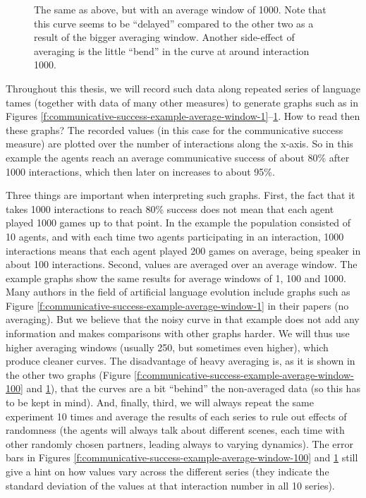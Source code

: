 \begin{figure}[p]
  \caption{The same as above, but with an average window of 1000. Note
    that this curve seems to be ``delayed'' compared to the other two
    as a result of the bigger averaging window. Another side-effect of
    averaging is the little ``bend'' in the curve at around
    interaction 1000.}
  \label{f:communicative-success-example-average-window-1000}
\end{figure}
\stopfiguregroup

\noindent Throughout this thesis, we will record such data along
repeated series of language tames (together with data of many other
measures) to generate graphs such as in Figures
\ref{f:communicative-success-example-average-window-1}--\ref{f:communicative-success-example-average-window-1000}. How
to read then these graphs? The recorded values (in this case for the
communicative success measure) are plotted over the number of
interactions along the x-axis. So in this example the agents reach an
average communicative success of about 80\% after 1000 interactions,
which then later on increases to about 95\%.

Three things are important when interpreting such graphs. First, the
fact that it takes 1000 interactions to reach 80\% success does not
mean that each agent played 1000 games up to that point. In the
example the population consisted of 10 agents, and with each time two
agents participating in an interaction, 1000 interactions means that
each agent played 200 games on average, being speaker in about 100
interactions. Second, values are averaged over an average window. The
example graphs show the same results for average windows of 1, 100 and
1000. Many authors in the field of artificial language evolution
include graphs such as Figure
\ref{f:communicative-success-example-average-window-1} in their papers
(no averaging). But we believe that the noisy curve in that example
does not add any information and makes comparisons with other graphs
harder. We will thus use higher averaging windows (usually 250, but
sometimes even higher), which produce cleaner curves. The disadvantage
of heavy averaging is, as it is shown in the other two graphs (Figure
\ref{f:communicative-success-example-average-window-100} and
\ref{f:communicative-success-example-average-window-1000}), that the
curves are a bit ``behind'' the non-averaged data (so this has to be
kept in mind). And, finally, third, we will always repeat the same
experiment 10 times and average the results of each series to rule out
effects of randomness (the agents will always talk about different
scenes, each time with other randomly chosen partners, leading always
to varying dynamics). The error bars in Figures
\ref{f:communicative-success-example-average-window-100} and
\ref{f:communicative-success-example-average-window-1000} still give a
hint on how values vary across the different series (they indicate the
standard deviation of the values at that interaction number in all 10
series).

